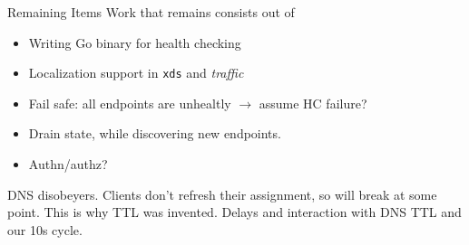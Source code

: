 \documentclass[aspectratio=169]{beamer}
\begin{document}
    \begin{frame}{Remaining Items}
        Work that remains consists out of
        \begin{itemize}
            \item Writing Go binary for health checking
            \item Localization support in \texttt{xds} and \emph{traffic}
            \item Fail safe: all endpoints are unhealtly $\rightarrow$ assume HC failure?
            \item Drain state, while discovering new endpoints.
            \item Authn/authz?
        \end{itemize}

        DNS disobeyers. Clients don't refresh their assignment, so will break at some point.
        This is why TTL was invented.
        Delays and interaction with DNS TTL and our 10s cycle.
    \end{frame}
\end{document}
